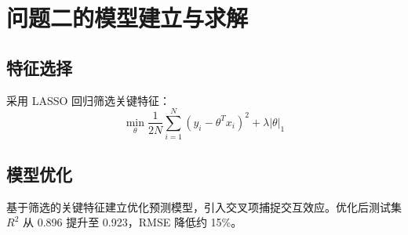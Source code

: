 \section{问题二的模型建立与求解}

\subsection{特征选择}

采用 LASSO 回归筛选关键特征：
\[
  \min_{\theta} \frac{1}{2N} \sum_{i=1}^{N} (y_i - \theta^T x_i)^2 + \lambda |\theta|_1
\]

\subsection{模型优化}

基于筛选的关键特征建立优化预测模型，引入交叉项捕捉交互效应。优化后测试集 $R^2$ 从 0.896 提升至 0.923，RMSE 降低约 15\%。
